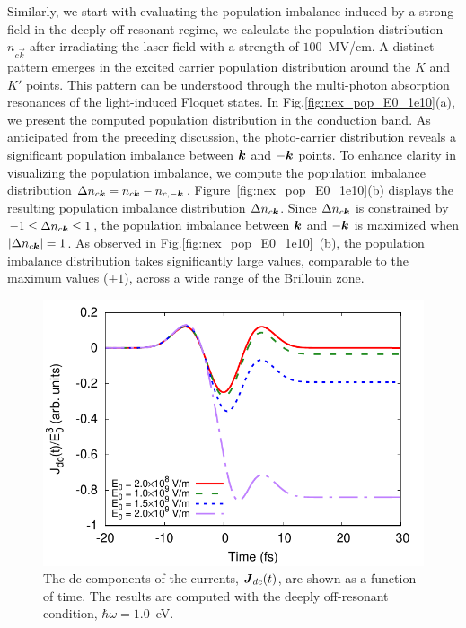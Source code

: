 Similarly, we start with evaluating the population imbalance induced by a strong field in the
deeply off-resonant regime, we calculate the population distribution $n_{c\vec{k}}$ after
irradiating the laser field with a strength of $100$~MV/cm. A distinct pattern emerges in the excited carrier population distribution around the $K$ and $K'$ points. This pattern can be understood through the multi-photon absorption resonances of the light-induced Floquet states\cite{galler2023mapping}. In Fig.\ref{fig:nex_pop_E0_1e10}(a), we present the computed population distribution in the conduction band. As anticipated from the preceding discussion, the photo-carrier distribution reveals a significant population imbalance between $\boldsymbol{k}$ and $-\boldsymbol{k}$ points. To enhance clarity in visualizing the population imbalance, we compute the population imbalance distribution $\Delta n_{c\boldsymbol{k}}=n_{c\boldsymbol{k}}-n_{c, -\boldsymbol{k}}$. Figure~\ref{fig:nex_pop_E0_1e10}(b) displays the resulting population imbalance distribution $\Delta n_{c\boldsymbol{k}}$. Since $\Delta n_{c\boldsymbol{k}}$ is constrained by $-1\le \Delta n_{c\boldsymbol{k}} \le 1$, the population imbalance between $\boldsymbol{k}$ and $-\boldsymbol{k}$ is maximized when $|\Delta n_{c\boldsymbol{k}}|=1$. As observed in Fig.\ref{fig:nex_pop_E0_1e10}~(b), the population imbalance distribution takes significantly large values, comparable to the maximum values ($\pm 1$), across a wide range of the Brillouin zone.
\begin{figure}[htbp]
\centering
\includegraphics[width=0.8\linewidth]{pic/current_off_resonant.pdf}
\caption{\label{fig:current_off_resonant} 
The dc components of the currents, $\boldsymbol J_{dc}(t)$, are shown as a function of time. The results are computed with the deeply off-resonant condition, $\hbar\omega = 1.0$~eV.}
\end{figure}

